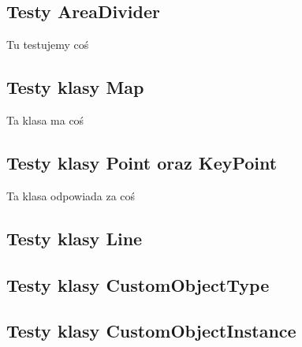 \documentclass[a4paper,11pt]{article}
\newcommand\tab[1][0.6cm]{\hspace*{#1}}
\begin{document}
\subsection{Testy AreaDivider}

\tab Tu testujemy coś


\subsection{Testy klasy Map}

\tab Ta klasa ma coś

\subsection{Testy klasy Point oraz KeyPoint}

\tab Ta klasa odpowiada za coś

\subsection{Testy klasy Line}

\subsection{Testy klasy CustomObjectType}

\subsection{Testy klasy CustomObjectInstance}
\end{document}
